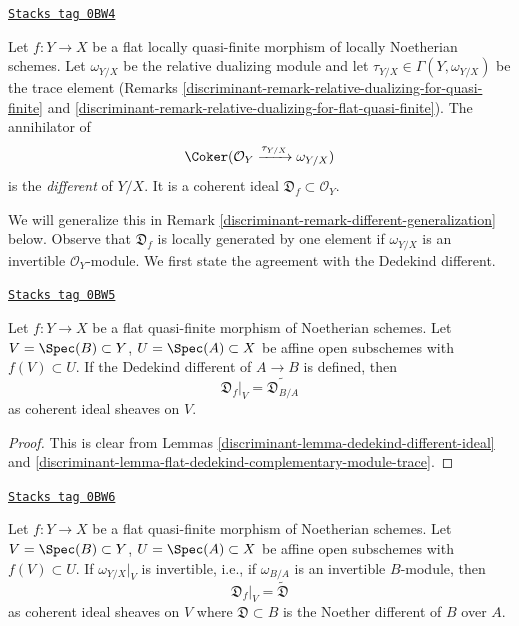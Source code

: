 \begin{definition}[Different]
\label{discriminant-definition-different}
\href{https://stacks.math.columbia.edu/tag/0BW4}{\texttt{Stacks tag 0BW4}}

Let $f : Y \to X$ be a flat locally quasi-finite morphism of
locally Noetherian schemes.
Let $\omega_{Y/X}$ be the relative dualizing module and let
$\tau_{Y/X} \in \Gamma(Y, \omega_{Y/X})$ be the trace element
(Remarks \ref{discriminant-remark-relative-dualizing-for-quasi-finite} and
\ref{discriminant-remark-relative-dualizing-for-flat-quasi-finite}).
The annihilator of
$$
\Coker(\mathcal{O}_Y \xrightarrow{\tau_{Y/X}} \omega_{Y/X})
$$
is the {\it different} of $Y/X$. It is a coherent ideal
$\mathfrak{D}_f \subset \mathcal{O}_Y$.
\end{definition}

We will generalize this in Remark \ref{discriminant-remark-different-generalization} below.
Observe that $\mathfrak{D}_f$ is locally generated by one element if
$\omega_{Y/X}$ is an invertible $\mathcal{O}_Y$-module.
We first state the agreement with the Dedekind different.

\begin{lemma}
\label{discriminant-lemma-flat-agree-dedekind}
\href{https://stacks.math.columbia.edu/tag/0BW5}{\texttt{Stacks tag 0BW5}}

Let $f : Y \to X$ be a flat quasi-finite morphism of Noetherian schemes.
Let $V = \Spec(B) \subset Y$, $U = \Spec(A) \subset X$
be affine open subschemes with $f(V) \subset U$.
If the Dedekind different of $A \to B$ is defined, then
$$
\mathfrak{D}_f|_V = \widetilde{\mathfrak{D}_{B/A}}
$$
as coherent ideal sheaves on $V$.
\end{lemma}

\begin{proof}

This is clear from Lemmas \ref{discriminant-lemma-dedekind-different-ideal} and
\ref{discriminant-lemma-flat-dedekind-complementary-module-trace}.
\end{proof}

\begin{lemma}
\label{discriminant-lemma-flat-gorenstein-agree-noether}
\href{https://stacks.math.columbia.edu/tag/0BW6}{\texttt{Stacks tag 0BW6}}

Let $f : Y \to X$ be a flat quasi-finite morphism of Noetherian schemes.
Let $V = \Spec(B) \subset Y$, $U = \Spec(A) \subset X$
be affine open subschemes with $f(V) \subset U$.
If $\omega_{Y/X}|_V$ is invertible, i.e., if $\omega_{B/A}$
is an invertible $B$-module, then
$$
\mathfrak{D}_f|_V = \widetilde{\mathfrak{D}}
$$
as coherent ideal sheaves on $V$ where
$\mathfrak{D} \subset B$ is the Noether different of $B$ over $A$.
\end{lemma}

